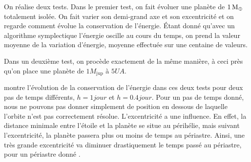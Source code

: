 On réalise deux tests. Dans le premier test, on fait évoluer une planète de $1\mathrm{\thinspace M_\oplus}$ totalement isolée. On fait varier son demi-grand axe et son excentricité et on regarde comment évolue la conservation de l'énergie. Étant donné qu'avec un algorithme symplectique l'énergie oscille au cours du temps, on prend la valeur moyenne de la variation d'énergie, moyenne effectuée sur une centaine de valeurs.

Dans un deuxième test, on procède exactement de la même manière, à ceci près qu'on place une planète de $1\unit{M_\text{jup}}$ à $5\unit{UA}$. 

 montre l'évolution de la conservation de l'énergie dans ces deux tests pour deux pas de temps différents, $h=1\unit{jour}$ et $h=0.4\unit{jour}$. Pour un pas de temps donné, nous ne pouvons pas donner simplement de position en dessous de laquelle l'orbite n'est pas correctement résolue. L'excentricité a une influence. En effet, la distance minimale entre l'étoile et la planète se situe au périhélie, mais suivant l'excentricité, la planète passera plus ou moins de temps au périastre. Ainsi, une très grande excentricité va diminuer drastiquement le temps passé au périastre, pour un périastre donné \citep{rauch1999dynamical, levison2000symplectically}. 

